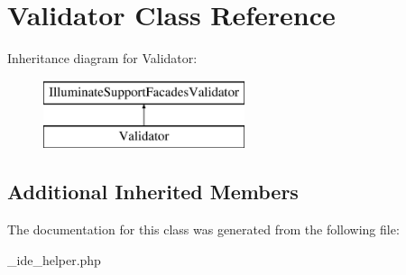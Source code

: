 \hypertarget{class_validator}{}\section{Validator Class Reference}
\label{class_validator}
Inheritance diagram for Validator\+:\begin{figure}[H]
\begin{center}
\leavevmode
\includegraphics[height=2.000000cm]{class_validator}
\end{center}
\end{figure}
\subsection*{Additional Inherited Members}


The documentation for this class was generated from the following file\+:\begin{DoxyCompactItemize}
\item 
\+\_\+ide\+\_\+helper.\+php\end{DoxyCompactItemize}
